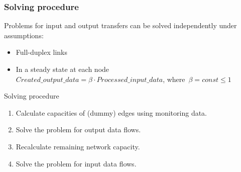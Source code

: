 \documentclass{beamer}
\begin{document}
\begin{frame}\frametitle{Solving procedure}
\begin{block}{}
Problems for input and output transfers can be solved independently under assumptions: 
\begin{itemize}
\item Full-duplex links
\item In a steady state at each node $Created\_output\_data = \beta \cdot Processed\_input\_data $, where~$\beta = const\leq 1$
\end{itemize}
\end{block} 

\begin{block}{Solving procedure}
\begin{enumerate}
\item Calculate capacities of (dummy) edges using monitoring data.
\item Solve the problem for output data flows.
\item Recalculate remaining network capacity.
\item Solve the problem for input data flows.
\end{enumerate}
\end{block}    
\end{frame}
\end{document}
